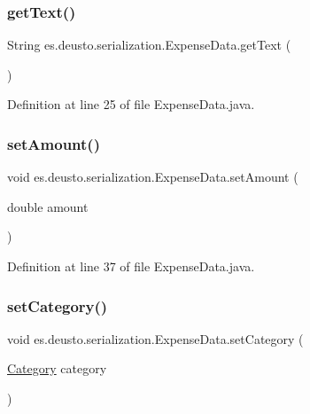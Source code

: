 \subsubsection{\texorpdfstring{get\+Text()}{getText()}}
{\footnotesize\ttfamily String es.\+deusto.\+serialization.\+Expense\+Data.\+get\+Text (\begin{DoxyParamCaption}{ }\end{DoxyParamCaption})}



Definition at line 25 of file Expense\+Data.\+java.

\mbox{\label{classes_1_1deusto_1_1serialization_1_1_expense_data_a9e78d6a6acc6fc0fd05f28a09432caf2}} 
\subsubsection{\texorpdfstring{set\+Amount()}{setAmount()}}
{\footnotesize\ttfamily void es.\+deusto.\+serialization.\+Expense\+Data.\+set\+Amount (\begin{DoxyParamCaption}\item[{double}]{amount }\end{DoxyParamCaption})}



Definition at line 37 of file Expense\+Data.\+java.

\mbox{\label{classes_1_1deusto_1_1serialization_1_1_expense_data_a54bbe919419f8750caaed58a09d2b326}} 
\subsubsection{\texorpdfstring{set\+Category()}{setCategory()}}
{\footnotesize\ttfamily void es.\+deusto.\+serialization.\+Expense\+Data.\+set\+Category (\begin{DoxyParamCaption}\item[{\hyperlink{enumes_1_1deusto_1_1server_1_1jdo_1_1_category}{Category}}]{category }\end{DoxyParamCaption})}



